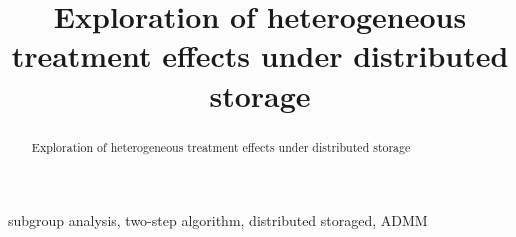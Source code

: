 \documentclass[review]{elsarticle}
\begin{document}
\begin{frontmatter}

\title{Exploration of heterogeneous treatment effects under distributed storage }

\author{}

\begin{abstract}
Exploration of heterogeneous treatment effects under distributed storage 
\end{abstract}

\begin{keyword}
subgroup analysis, two-step algorithm, distributed storaged, ADMM
\end{keyword}

\end{frontmatter}

\linenumbers
\end{document}
